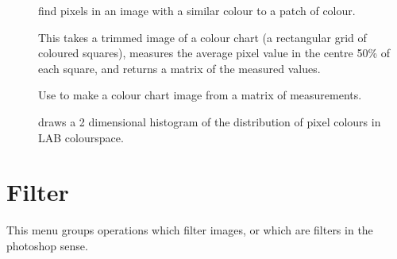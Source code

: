 \begin{description}
\item[]
	find pixels in an image with a similar colour to a patch of
	colour. 

\item[]
	This takes a trimmed image of a colour chart (a rectangular grid of
	coloured squares), measures the average pixel value in the centre 50\%
	of each square, and returns a matrix of the measured values. 

	Use  to make a colour chart image from
	a matrix of measurements. 

\item[]
	draws a 2 dimensional histogram of the distribution of pixel colours
	in LAB colourspace.

\end{description}

\section{Filter}

This menu groups operations which filter images, or which are filters in the
photoshop sense.

